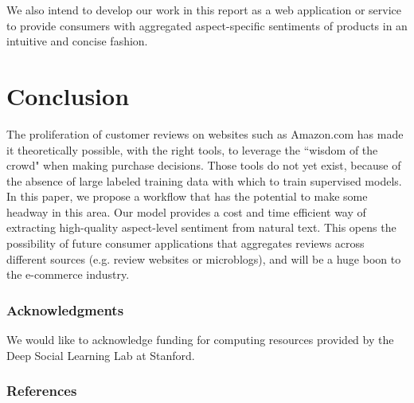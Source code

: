 \documentclass{article} %
\begin{document}
We also intend to develop our work in this report as a web application or service to provide consumers with aggregated aspect-specific sentiments of products in an intuitive and concise fashion.

\section{Conclusion}

The proliferation of customer reviews on websites such as Amazon.com has made it theoretically possible, with the right tools, to leverage the ``wisdom of the crowd" when making purchase decisions. Those tools do not yet exist, because of the absence of large labeled training data with which to train supervised models. In this paper, we propose a workflow that has the potential to make some headway in this area. Our model provides a cost and time efficient way of extracting high-quality aspect-level sentiment from natural text. This opens the possibility of future consumer applications that aggregates reviews across different sources (e.g. review websites or microblogs), and will be a huge boon to the e-commerce industry.






\subsubsection*{Acknowledgments}

We would like to acknowledge funding for computing resources provided by the Deep Social Learning Lab at Stanford.

\subsubsection*{References} %
\end{document}
